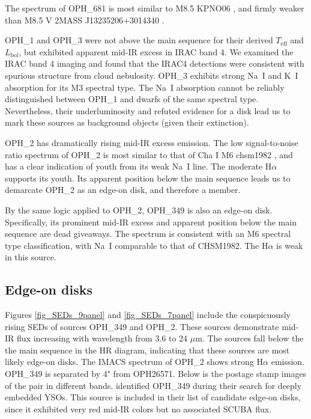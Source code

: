 The spectrum of OPH\_681 is most similar to M8.5 KPNO06 \citep{1998AJ....115.2074B,2003ApJ...593.1093L}, and firmly weaker than M8.5 V 2MASS J13235206+3014340 \citep{2007AJ....133..439C}.  

OPH\_1 and OPH\_3 were not above the main sequence for their derived $T_{\mathrm{eff}}$ and $L_{\mathrm{bol}}$, but exhibited apparent mid-IR excess in IRAC band 4.  We examined the IRAC band 4 imaging and found that the IRAC4 detections were consistent with spurious structure from cloud nebulosity.  OPH\_3 exhibits strong Na~I and K~I absorption for its M3 spectral type.  The Na~I absorption cannot be reliably distinguished between OPH\_1 and dwarfs of the same spectral type.  Nevertheless, their underluminosity and refuted evidence for a disk lead us to mark these sources as background objects (given their extinction).

OPH\_2 has dramatically rising mid-IR excess emission.  The low signal-to-noise ratio spectrum of OPH\_2 is most similar to that of Cha I M6 chsm1982 \citep{2004ApJ...602..816L}, and has a clear indication of youth from its weak Na~I line.  The moderate H$\alpha$ supports its youth.  Its apparent position below the main sequence leads us to demarcate OPH\_2 as an edge-on disk, and therefore a member.

By the same logic applied to OPH\_2, OPH\_349 is also an edge-on disk.  Specifically, its prominent mid-IR excess and apparent position below the main sequence are dead giveaways.  The spectrum is consistent with an M6 spectral type classification, with Na~I comparable to that of CHSM1982.  The H$\alpha$ is weak in this source.

\subsection{Edge-on disks}
Figures \ref{fig_SEDs_9panel} and \ref{fig_SEDs_7panel} include the conspicuously rising SEDs of sources OPH\_349 and OPH\_2.  These sources demonstrate mid-IR flux increasing with wavelength from 3.6 to 24 $\mu$m.  The sources fall below the the main sequence in the HR diagram, indicating that these sources are most likely edge-on disks.  The IMACS spectrum of OPH\_2 shows strong H$\alpha$ emission.  OPH\_349 is separated by 4" from OPH26571.  Below is the postage stamp images of the pair in different bands.  \cite{2008ApJ...683..822J} identified OPH\_349 during their search for deeply embedded YSOs.  This source is included in their list of candidate edge-on disks, since it exhibited very red mid-IR colors but no associated SCUBA flux.


